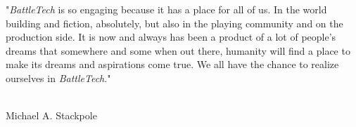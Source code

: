 \begin{center}
\parbox{0.6\textwidth}{
\begin{center}
"\emph{BattleTech} is so engaging because it has a place for all of us.
In the world building and fiction, absolutely, but also in the playing community and on the production side.
It is now and always has been a product of a lot of people’s dreams that somewhere and some when out there, humanity will find a place to make its dreams and aspirations come true.
We all have the chance to realize ourselves in \emph{BattleTech}."
\end{center}
}

~\\

Michael A. Stackpole
\end{center}
